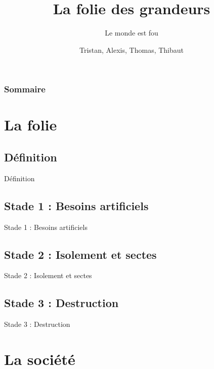 \documentclass{beamer}
\title{La folie des grandeurs}
\subtitle{Le monde est fou}
\author{Tristan, Alexis, Thomas, Thibaut}
\begin{document}
\begin{frame}
  \titlepage
\end{frame}

\begin{frame}
    \frametitle{Sommaire}
    \begin{multicols}{2}
      {
		\setcounter{tocdepth}{1}
        \tableofcontents
      }
    \end{multicols}
\end{frame}

\section{La folie}

\subsection{Définition}
\begin{frame}{Définition}

\end{frame}

\subsection{Stade 1 : Besoins artificiels}
\begin{frame}{Stade 1 : Besoins artificiels}

\end{frame}


\subsection{Stade 2 : Isolement et sectes}
\begin{frame}{Stade 2 : Isolement et sectes}

\end{frame}

\subsection{Stade 3 : Destruction}
\begin{frame}{Stade 3 : Destruction}

\end{frame}


\section{La société}
\end{document}

